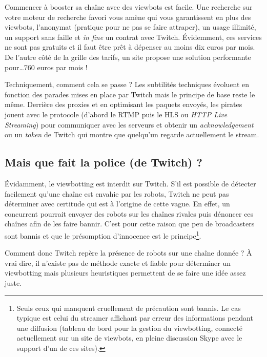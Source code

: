 \documentclass[a4paper]{article}
\begin{document}
Commencer à booster sa chaîne avec des viewbots est facile. Une recherche sur votre moteur de recherche favori vous amène qui vous garantissent en plus des viewbots, l'anonymat (pratique pour ne pas se faire attraper), un usage illimité, un support sans faille et \textit{in fine} un contrat avec Twitch. Évidemment, ces services ne sont pas gratuits et il faut être prêt à dépenser au moins dix euros par mois. De l'autre côté de la grille des tarifs, un site propose une solution performante pour\ldots 760 euros par mois\cite{TropCher} ! 

Techniquement, comment cela se passe ? Les subtilités techniques évoluent en fonction des parades mises en place par Twitch mais le principe de base reste le même. Derrière des proxies et en optimisant les paquets envoyés, les pirates jouent avec le protocole (d'abord le RTMP puis le HLS ou \textit{HTTP Live Streaming}) pour communiquer avec les serveurs et obtenir un \textit{acknowledgement} ou un \textit{token} de Twitch qui montre que quelqu'un regarde actuellement le stream. 

\subsection{Mais que fait la police (de Twitch) ?}

Évidamment, le viewbotting est interdit sur Twitch. S'il est possible de détecter facilement qu'une chaîne est envahie par les robots, Twitch ne peut pas déterminer avec certitude qui est à l'origine de cette vague. En effet, un concurrent pourrait envoyer des robots sur les chaînes rivales puis dénoncer ces chaînes afin de les faire bannir. C'est pour cette raison que peu de broadcasters sont bannis et que le présomption d'innocence est le principe\footnote{Seuls ceux qui manquent cruellement de précaution sont bannis. Le cas typique est celui du streamer affichant par erreur des informations pendant une diffusion (tableau de bord pour la gestion du viewbotting, connecté actuellement sur un site de viewbots, en pleine discussion Skype avec le support d'un de ces sites).}. 

Comment donc Twitch repère la présence de robots sur une chaîne donnée ? À vrai dire, il n'existe pas de méthode exacte et fiable pour déterminer un viewbotting mais plusieurs heuristiques permettent de se faire une idée assez juste. 
\end{document}
